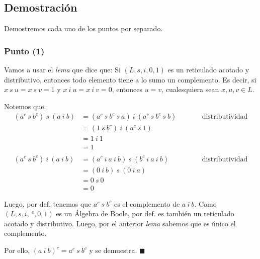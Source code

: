 \documentclass{article}
\begin{document}
\subsection*{Demostración}
Demostremos cada uno de los puntos por separado.

\subsubsection*{Punto (1)}
Vamos a usar el \textit{lema} que dice que: Si $(L,s,i,0,1)$ es un reticulado acotado y distributivo, entonces todo elemento tiene a lo sumo un complemento. Es decir, si $x\ s\ u=x\ s\ v=1$ y $x\ i\ u=x\ i\ v=0$, entonces $u=v$, cualesquiera sean $x,u,v\in L$.

\vspace{0.3cm}
Notemos que:
\begin{equation*}
  \begin{alignedat}{2}
    (a^c\ s\ b^c)\ s\ (a\ i\ b) & = (a^c\ s\ b^c\ s\ a)\ i\ (a^c\ s\ b^c\ s\ b) &  & \qquad\text{distributividad} \\
                                & =(1\ s\ b^c)\ i\ (a^c\ s\ 1)                                                    \\
                                & =1\ i\ 1                                                                        \\
                                & =1
    \\
    \\
    (a^c\ s\ b^c)\ i\ (a\ i\ b) & = (a^c\ i\ a\ i\ b)\ s\ (b^c\ i\ a\ i\ b)     &  & \qquad\text{distributividad} \\
                                & =(0\ i\ b)\ s\ (0\ i\ a)                                                        \\
                                & =0\ s\ 0                                                                        \\
                                & =0
  \end{alignedat}
\end{equation*}

Luego, por def. tenemos que $a^c\ s\ b^c$ es el complemento de $a\ i\ b$. Como $(L,s,i,\ ^c,0,1)$ es un Álgebra de Boole, por def. es también un reticulado acotado y distributivo. Luego, por el anterior \textit{lema} sabemos que es único el complemento.

Por ello, $(a\ i\ b)^c=a^c\ s\ b^c$ y se demuestra. $\blacksquare$
\end{document}
